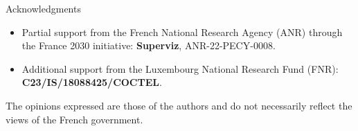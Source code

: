 \begin{frame}{Acknowledgments}
    \small
    \begin{itemize}
        \setlength\itemsep{0.8em}
        \item Partial support from the French National Research Agency (ANR) through the France 2030 initiative:
              \textbf{Superviz}, ANR-22-PECY-0008.
        \item Additional support from the Luxembourg National Research Fund (FNR):
              \textbf{C23/IS/18088425/COCTEL}.
    \end{itemize}

    \vfill
    \centering
    {\footnotesize\color{black!65}
        The opinions expressed are those of the authors and do not necessarily reflect the views of the French government.}
\end{frame}
